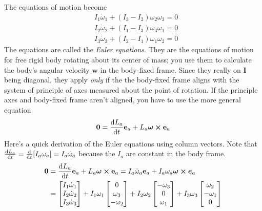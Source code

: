 \documentclass[11pt, a4paper]{article}
\newcommand{\e}{\mathbf{e}} %
\newcommand{\mat}[1]{\mathbf{#1}} %
\begin{document}
\begin{itemize}
	 The equations of motion become
	\begin{align*}
		&I_{1}{\dot  {\omega }}_{{1}} + (I_{3}-I_{2}) \omega_{2} \omega_{3} = 0\\
		&I_{2}{\dot  {\omega}}_{{2}} + (I_{1}-I_{3}) \omega_{3} \omega_{1} = 0\\
		&I_{3}{\dot  {\omega }}_{{3}} + (I_{2}-I_{1}) \omega _{1} \omega_{2} = 0
	\end{align*}
	The equations are called the \textit{Euler equations}. They are the equations of motion for free rigid body rotating about its center of mass; you use them to calculate the body's angular velocity $ \bm{w} $ in the body-fixed frame. Since they really on $ \mat{I} $ being diagonal, they apply \textit{only} if the the body-fixed frame aligns with the system of principle of axes measured about the point of rotation. If the principle axes and body-fixed frame aren't aligned, you have to use the more general equation
	\begin{equation*}
		\bm{0} = \dv{{L}_{a}}{t} \e_{a} + L_{a}\bm{\omega} \cross \e_{a}
	\end{equation*}
	Here's a quick derivation of the Euler equations using column vectors. Note that $ \dv{L_{a}}{t} = \dv{}{t}[I_{a}\omega_{a}] = I_{a}\dot{\omega}_{a} $ because the $ I_{a} $ are constant in the body frame.
	\begin{align*}
		\bm{0} & = \dv{{L}_{a}}{t} \e_{a} + L_{a}\bm{\omega} \cross \e_{a} = I_{a}\dot{\omega}_{a} \e_{a} + I_{a}\omega_{a} \bm{\omega}\cross \bm{e}_{a}\\
		&=\begin{bmatrix}
			I_{1}\dot{\omega}_{1}\\
			I_{2}\dot{\omega}_{2}\\
			I_{3}\dot{\omega}_{3}
		\end{bmatrix} + I_{1}\omega_{1} 
		\begin{bmatrix}
			0\\
			\omega_{3}\\
			-\omega_{2}
		\end{bmatrix} + I_{2}\omega_{2} 
		\begin{bmatrix}
			-\omega_{3}\\
			0\\
			\omega_{1}
		\end{bmatrix} + I_{3}\omega_{3} 
		\begin{bmatrix}
			\omega_{2}\\
			-\omega_{1}\\
			0
		\end{bmatrix}\\

\end{align*}
\end{itemize}
\end{document}
